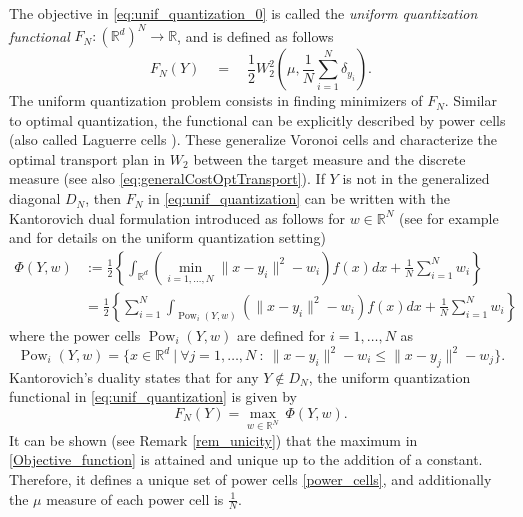 \documentclass[11pt]{article}
\DeclareMathOperator{\Pow}{Pow}
\newcommand{\R}{\mathbb R}
\newcommand{\1}{\mathbbm{1}}
\numberwithin{equation}{section}
\begin{document}
The objective in \eqref{eq:unif_quantization_0} is called the \emph{uniform quantization functional} $F_N \colon  (\mathbb{R}^{d})^{N} \to \R$, and is defined as follows
\begin{equation}\label{eq:unif_quantization}
	F_N(Y) \quad = \quad  \frac{1}{2}W_{2}^{2}\left(\mu,\frac{1}{N}\sum_{i=1}^{N} \delta_{y_{i}}\right).
\end{equation}
The uniform quantization problem consists in finding minimizers of $F_N$. Similar to optimal quantization, the functional can be explicitly described by power cells (also called Laguerre cells \cite{nonassymptotic}). These generalize Voronoi cells and characterize the optimal transport plan in $W_2$ between the target measure and the discrete measure (see also  \eqref{eq:generalCostOptTransport}). 
If $Y$ is not in the generalized diagonal $D_{N}$, then $F_N$ in \eqref{eq:unif_quantization} can be written with the Kantorovich dual formulation introduced as follows for $w\in\R^N$ (see for example \cite[Theorem 5.9]{villanioptoldnew} and \cite[Section 2]{nonassymptotic} for details on the uniform quantization setting)
\begin{equation}
	\label{Objective_G}
	\begin{split}
		\Phi(Y,w)&:=\frac{1}{2}\left\{\int_{\mathbb{R}^{d}}{\left(\min_{i=1,\ldots,N}\|x-y_{i} \|^{2}-w_{i}\right)f(x)dx}+\frac{1}{N}\sum_{i=1}^{N}{w_{i}}\right\}\\
		&=\frac{1}{2}\left\{\sum_{i=1}^{N}\int_{\Pow_{i}(Y,w)}\left(\|x-y_{i} \|^{2}-w_{i}\right)f(x)dx+\frac{1}{N}\sum_{i=1}^{N}{w_{i}}\right\}
	\end{split}
\end{equation}
where the power cells $\Pow_{i}(Y,w)$ are defined for $i=1,\ldots,N$ as
\begin{equation}
	\label{power_cells}
	\Pow_{i}(Y,w)=\{ x\in \mathbb{R}^{d}\: |\: \forall j=1,\ldots,N \: :\: \|x-y_{i}\|^{2}-w_{i} \leq \|x-y_{j}\|^{2}-w_{j} \}.
\end{equation}
Kantorovich's duality states that for any $Y \not \in D_N$, the uniform quantization functional in \eqref{eq:unif_quantization} is given by
\begin{equation}
	\label{Objective_function}
	F_{N}(Y) = \max_{w\in \mathbb{R}^{N}}\ \Phi(Y,w).
\end{equation}
It can be shown (see Remark \ref{rem_unicity}) that the maximum in \eqref{Objective_function} is attained and unique up to the addition of a constant. Therefore, it defines a unique set of power cells \eqref{power_cells}, and additionally the $\mu$ measure of each power cell is $\frac{1}{N}$.
\end{document}
